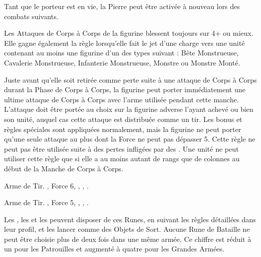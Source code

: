 Tant que le porteur est en vie, la Pierre peut être activée à nouveau lors des combats suivants.

\armyspecialruleentry{\thebiggertheyare}

Les Attaques de Corps à Corps de la figurine blessent toujours sur 4+ ou mieux. Elle gagne également la règle \swiftstride{} lorsqu'elle fait le jet d'une charge vers une unité contenant au moins une figurine d'un des types suivant : Bête Monstrueuse, Cavalerie Monstrueuse, Infanterie Monstrueuse, Monstre ou Monstre Monté.

\armyspecialruleentry{\comewithme}

Juste avant qu'elle soit retirée comme perte suite à une attaque de Corps à Corps durant la Phase de Corps à Corps, la figurine peut porter immédiatement une ultime attaque de Corps à Corps avec l'arme utilisée pendant cette manche. L'attaque doit être portée au choix sur la figurine adverse l'ayant achevé ou bien son unité, auquel cas cette attaque est distribuée comme un tir. Les bonus et règles spéciales sont appliquées normalement, mais la figurine ne peut porter qu'une seule attaque au plus dont la Force ne peut pas dépasser 5. Cette règle ne peut pas être utilisée suite à des pertes infligées par des \impacthits{}. Une unité ne peut utiliser cette règle que si elle a au moins autant de rangs que de colonnes au début de la Manche de Corps à Corps.

\closearmyspecialrules






\vspace*{1.5cm}
\startarmyarmoury

\startitemlistonecol

\listitemonecol{\wyrmslayerrocket} Arme de Tir. , Force 6, \flamingattacks{}, , \reload{}.

\listitemonecol{\forgerepeater} Arme de Tir. , Force 5, \flamingattacks{}, , \quicktofire{}.

\enditemlistonecol

\closearmyarmoury





\subtitle{}

Les \runicmasters{}, les \runicsmiths{} et les \anvilsofpower{} peuvent disposer de ces Runes, en suivant les règles détaillées dans leur profil, et les lancer comme des Objets de Sort. Aucune Rune de Bataille ne peut être choisie plus de deux fois dans une même armée. Ce chiffre est réduit à un pour les Patrouilles et augmenté à quatre pour les Grandes Armées.

